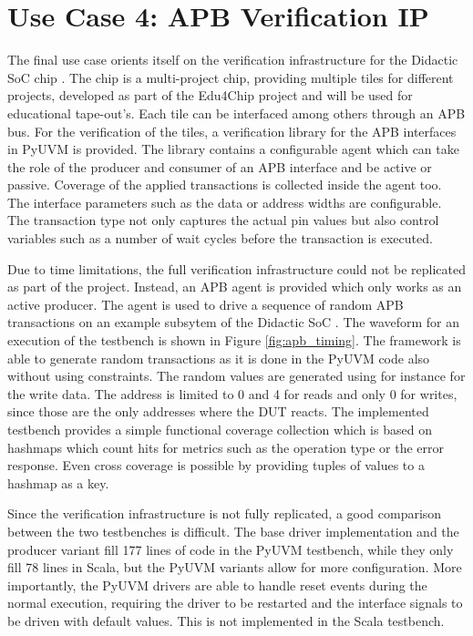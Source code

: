 


\section{Use Case 4: APB Verification IP} %

The final use case orients itself on the verification infrastructure for the Didactic SoC chip \cite{didactic}. The chip is a multi-project chip, providing multiple tiles for different projects, developed as part of the Edu4Chip project \cite{edu4chip} and will be used for educational tape-out's. Each tile can be interfaced among others through an APB bus. For the verification of the tiles, a verification library for the APB interfaces in PyUVM is provided. The library contains a configurable agent which can take the role of the producer and consumer of an APB interface and be active or passive. Coverage of the applied transactions is collected inside the agent too. The interface parameters such as the data or address widths are configurable. The transaction type not only captures the actual pin values but also control variables such as a number of wait cycles before the transaction is executed. 

Due to time limitations, the full verification infrastructure could not be replicated as part of the project. Instead, an APB agent is provided which only works as an active producer. The agent is used to drive a sequence of random APB transactions on an example subsytem of the Didactic SoC . The waveform for an execution of the testbench is shown in Figure \ref{fig:apb_timing}. The framework is able to generate random transactions as it is done in the PyUVM code also without using constraints. The random values are generated using for instance  for the write data. The address is limited to 0 and 4 for reads and only 0 for writes, since those are the only addresses where the DUT reacts. The implemented testbench provides a simple functional coverage collection which is based on hashmaps which count hits for metrics such as the operation type or the error response. Even cross coverage is possible by providing tuples of values to a hashmap as a key.

Since the verification infrastructure is not fully replicated, a good comparison between the two testbenches is difficult. The base driver implementation and the producer variant fill 177 lines of code in the PyUVM testbench, while they only fill 78 lines in Scala, but the PyUVM variants allow for more configuration. More importantly, the PyUVM drivers are able to handle reset events during the normal execution, requiring the driver to be restarted and the interface signals to be driven with default values. This is not implemented in the Scala testbench. 

